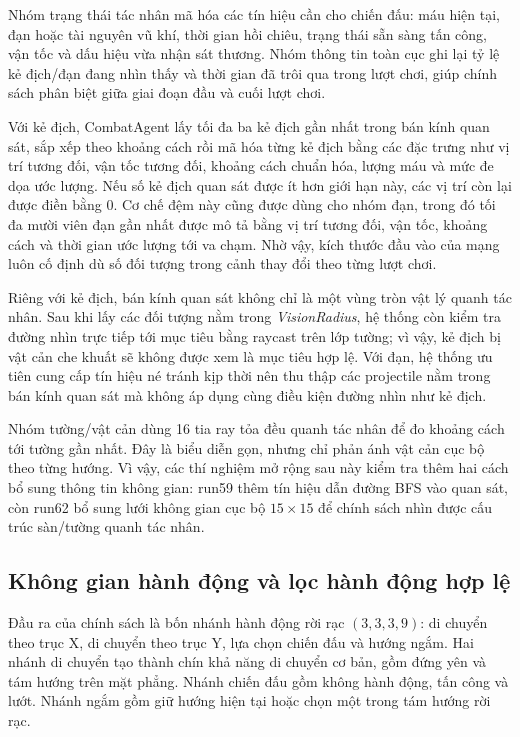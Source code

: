 Nhóm trạng thái tác nhân mã hóa các tín hiệu cần cho chiến đấu: máu hiện tại, đạn hoặc tài nguyên vũ khí, thời gian hồi chiêu, trạng thái sẵn sàng tấn công, vận tốc và dấu hiệu vừa nhận sát thương. Nhóm thông tin toàn cục ghi lại tỷ lệ kẻ địch/đạn đang nhìn thấy và thời gian đã trôi qua trong lượt chơi, giúp chính sách phân biệt giữa giai đoạn đầu và cuối lượt chơi.

Với kẻ địch, CombatAgent lấy tối đa ba kẻ địch gần nhất trong bán kính quan sát, sắp xếp theo khoảng cách rồi mã hóa từng kẻ địch bằng các đặc trưng như vị trí tương đối, vận tốc tương đối, khoảng cách chuẩn hóa, lượng máu và mức đe dọa ước lượng. Nếu số kẻ địch quan sát được ít hơn giới hạn này, các vị trí còn lại được điền bằng 0. Cơ chế đệm này cũng được dùng cho nhóm đạn, trong đó tối đa mười viên đạn gần nhất được mô tả bằng vị trí tương đối, vận tốc, khoảng cách và thời gian ước lượng tới va chạm. Nhờ vậy, kích thước đầu vào của mạng luôn cố định dù số đối tượng trong cảnh thay đổi theo từng lượt chơi.

Riêng với kẻ địch, bán kính quan sát không chỉ là một vùng tròn vật lý quanh tác nhân. Sau khi lấy các đối tượng nằm trong \emph{VisionRadius}, hệ thống còn kiểm tra đường nhìn trực tiếp tới mục tiêu bằng raycast trên lớp tường; vì vậy, kẻ địch bị vật cản che khuất sẽ không được xem là mục tiêu hợp lệ. Với đạn, hệ thống ưu tiên cung cấp tín hiệu né tránh kịp thời nên thu thập các projectile nằm trong bán kính quan sát mà không áp dụng cùng điều kiện đường nhìn như kẻ địch.

Nhóm tường/vật cản dùng 16 tia ray tỏa đều quanh tác nhân để đo khoảng cách tới tường gần nhất. Đây là biểu diễn gọn, nhưng chỉ phản ánh vật cản cục bộ theo từng hướng. Vì vậy, các thí nghiệm mở rộng sau này kiểm tra thêm hai cách bổ sung thông tin không gian: run59 thêm tín hiệu dẫn đường BFS vào quan sát, còn run62 bổ sung lưới không gian cục bộ $15\times15$ để chính sách nhìn được cấu trúc sàn/tường quanh tác nhân.

\subsection{Không gian hành động và lọc hành động hợp lệ}

Đầu ra của chính sách là bốn nhánh hành động rời rạc $(3,3,3,9)$: di chuyển theo trục X, di chuyển theo trục Y, lựa chọn chiến đấu và hướng ngắm. Hai nhánh di chuyển tạo thành chín khả năng di chuyển cơ bản, gồm đứng yên và tám hướng trên mặt phẳng. Nhánh chiến đấu gồm không hành động, tấn công và lướt. Nhánh ngắm gồm giữ hướng hiện tại hoặc chọn một trong tám hướng rời rạc.

